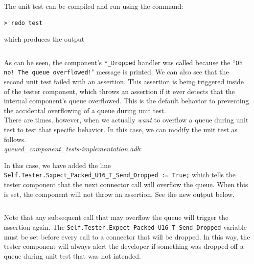 The unit test can be compiled and run using the command:

\vspace{5mm} %
\begin{verbatim}
> redo test
\end{verbatim}
\vspace{5mm} %

which produces the output

\vspace{5mm} %
\inputminted{text}{../example_architecture/queued_component/test/output.txt}
\vspace{5mm} %

As can be seen, the component's \texttt{*\_Dropped} handler was called because the ``\texttt{Oh no! The queue overflowed!}" message is printed. We can also see that the second unit test failed with an assertion. This assertion is being triggered inside of the tester component, which throws an assertion if it ever detects that the internal component's queue overflowed. This is the default behavior to preventing the accidental overflowing of a queue during unit test. \\

There are times, however, when we actually \textit{want} to overflow a queue during unit test to test that specific behavior. In this case, we can modify the unit test as follows. \\

\textit{queued\_component\_tests-implementation.adb}:

In this case, we have added the line \texttt{Self.Tester.Sxpect\_Packed\_U16\_T\_Send\_Dropped := True;} which tells the tester component that the next connector call will overflow the queue. When this is set, the component will not throw an assertion. See the new output below.

\vspace{5mm} %
\inputminted{text}{../example_architecture/queued_component/test2/output.txt}
\vspace{5mm} %

Note that any subsequent call that may overflow the queue will trigger the assertion again. The \texttt{Self.Tester.Expect\_Packed\_U16\_T\_Send\_Dropped} variable must be set before every call to a connector that will be dropped. In this way, the tester component will always alert the developer if something was dropped off a queue during unit test that was not intended. 

